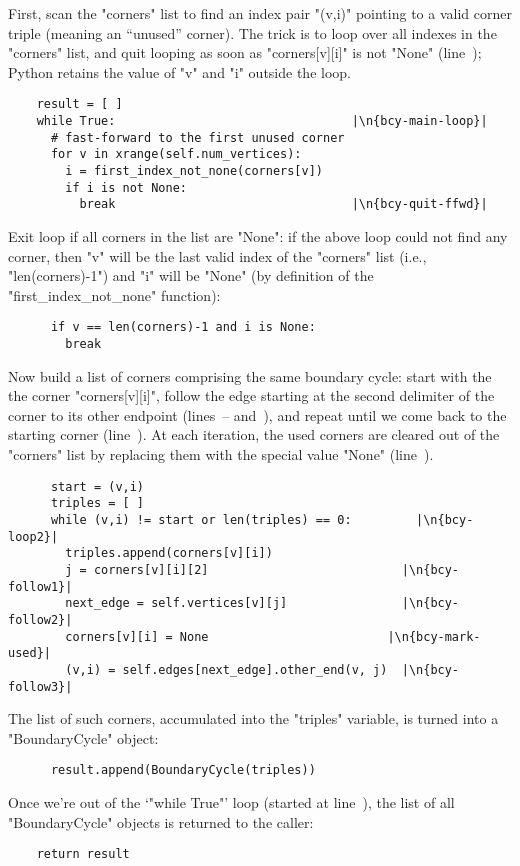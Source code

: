 First, scan the "corners" list to find an index pair "(v,i)" pointing
to a valid corner triple (meaning an ``unused'' corner). The trick is
to loop over all indexes in the "corners" list, and quit looping as
soon as "corners[v][i]" is not "None" (line~);
Python retains the value of "v" and "i" outside the loop.
\begin{lstlisting}
    result = [ ]
    while True:                                 |\n{bcy-main-loop}|
      # fast-forward to the first unused corner
      for v in xrange(self.num_vertices):
        i = first_index_not_none(corners[v])
        if i is not None:
          break                                 |\n{bcy-quit-ffwd}|

\end{lstlisting}
Exit loop if all corners in the list are "None": if the above loop
could not find any corner, then "v" will be the last valid index of
the "corners" list (i.e., "len(corners)-1") and "i" will be "None" (by
definition of the "first_index_not_none" function):
\begin{lstlisting}
      if v == len(corners)-1 and i is None:
        break

\end{lstlisting}
Now build a list of corners comprising the same boundary cycle: start
with the the corner "corners[v][i]", follow the edge starting at the
second delimiter of the corner to its other endpoint
(lines~-- and~), and
repeat until we come back to the starting corner
(line~). At each iteration, the used corners are cleared
out of the "corners" list by replacing them with the special value
"None" (line~).
\begin{lstlisting}
      start = (v,i)
      triples = [ ]
      while (v,i) != start or len(triples) == 0:         |\n{bcy-loop2}|
        triples.append(corners[v][i])
        j = corners[v][i][2]                           |\n{bcy-follow1}|
        next_edge = self.vertices[v][j]                |\n{bcy-follow2}|
        corners[v][i] = None                         |\n{bcy-mark-used}|
        (v,i) = self.edges[next_edge].other_end(v, j)  |\n{bcy-follow3}|
\end{lstlisting}
The list of such corners, accumulated into the "triples" variable, is
turned into a "BoundaryCycle" object:
\begin{lstlisting}
      result.append(BoundaryCycle(triples))

\end{lstlisting}
Once we're out of the `"while True"' loop (started at
line~), the list of all "BoundaryCycle" objects
is returned to the caller:
\begin{lstlisting}
    return result
    
\end{lstlisting}


